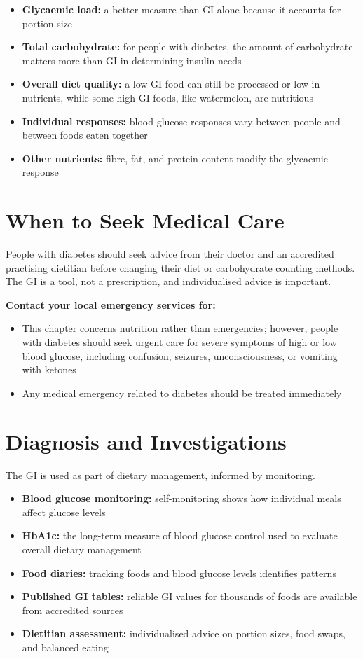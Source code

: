 \begin{itemize}
    \item \textbf{Glycaemic load:} a better measure than GI alone because it accounts for portion size
    \item \textbf{Total carbohydrate:} for people with diabetes, the amount of carbohydrate matters more than GI in determining insulin needs
    \item \textbf{Overall diet quality:} a low-GI food can still be processed or low in nutrients, while some high-GI foods, like watermelon, are nutritious
    \item \textbf{Individual responses:} blood glucose responses vary between people and between foods eaten together
    \item \textbf{Other nutrients:} fibre, fat, and protein content modify the glycaemic response
\end{itemize}

\section*{When to Seek Medical Care}
People with diabetes should seek advice from their doctor and an accredited practising dietitian before changing their diet or carbohydrate counting methods. The GI is a tool, not a prescription, and individualised advice is important.

\textbf{Contact your local emergency services for:}
\begin{itemize}
    \item This chapter concerns nutrition rather than emergencies; however, people with diabetes should seek urgent care for severe symptoms of high or low blood glucose, including confusion, seizures, unconsciousness, or vomiting with ketones
    \item Any medical emergency related to diabetes should be treated immediately
\end{itemize}

\section*{Diagnosis and Investigations}
The GI is used as part of dietary management, informed by monitoring.

\begin{itemize}
    \item \textbf{Blood glucose monitoring:} self-monitoring shows how individual meals affect glucose levels
    \item \textbf{HbA1c:} the long-term measure of blood glucose control used to evaluate overall dietary management
    \item \textbf{Food diaries:} tracking foods and blood glucose levels identifies patterns
    \item \textbf{Published GI tables:} reliable GI values for thousands of foods are available from accredited sources
    \item \textbf{Dietitian assessment:} individualised advice on portion sizes, food swaps, and balanced eating
\end{itemize}

